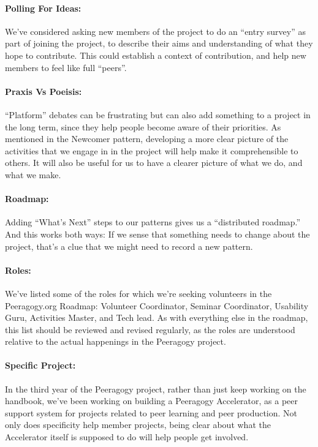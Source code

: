 \paragraph{Polling For Ideas:} We’ve considered asking new members of the project to do an “entry survey” as part of joining the project, to describe their aims and
understanding of what they hope to contribute. This could establish a
context of contribution, and help new members to feel like full “peers”.

\paragraph{Praxis Vs Poeisis:} “Platform” debates can be frustrating but can also add something to a project in the long term, since they help people become aware of their
priorities. As mentioned in the Newcomer pattern, developing a more clear
picture of the activities that we engage in in the project will help
make it comprehensible to others. It will also be useful for us to have
a clearer picture of what we do, and what we make.

\paragraph{Roadmap:} Adding ``What's Next'' steps to our patterns gives us a ``distributed roadmap.''  And this works both ways:  
If we sense that something needs to change about the project, that's a
clue that we might need to record a new pattern.

\paragraph{Roles:} We’ve listed some of the roles for which we’re seeking volunteers in
the Peeragogy.org Roadmap: Volunteer Coordinator, Seminar Coordinator,
Usability Guru, Activities Master, and Tech lead. As with everything
else in the roadmap, this list should be reviewed and revised
regularly, as the roles are understood relative to the actual
happenings in the Peeragogy project.

\paragraph{Specific Project:} In the third year of the Peeragogy project, rather than just keep
working on the handbook, we’ve been working on building a Peeragogy
Accelerator, as a peer support system for projects related to peer
learning and peer production. Not only does specificity help member
projects, being clear about what the Accelerator itself is supposed to
do will help people get involved.

